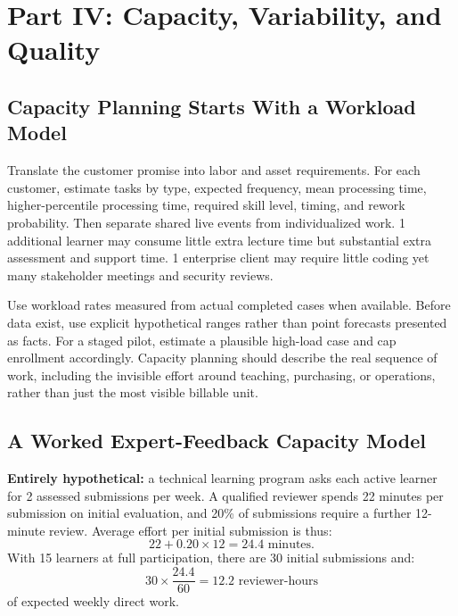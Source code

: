 \section*{Part IV: Capacity, Variability, and Quality}

\subsection{Capacity Planning Starts With a Workload Model}
\label{sec:capacity_planning_workload_model}

Translate the customer promise into labor and asset requirements. For each customer, estimate tasks by type, expected frequency, mean processing time, higher-percentile processing time, required skill level, timing, and rework probability. Then separate shared live events from individualized work. 1 additional learner may consume little extra lecture time but substantial extra assessment and support time. 1 enterprise client may require little coding yet many stakeholder meetings and security reviews.

Use workload rates measured from actual completed cases when available. Before data exist, use explicit hypothetical ranges rather than point forecasts presented as facts. For a staged pilot, estimate a plausible high-load case and cap enrollment accordingly. Capacity planning should describe the real sequence of work, including the invisible effort around teaching, purchasing, or operations, rather than just the most visible billable unit.

\subsection{A Worked Expert-Feedback Capacity Model}
\label{sec:worked_feedback_capacity_model}

\textbf{Entirely hypothetical:} a technical learning program asks each active learner for 2 assessed submissions per week. A qualified reviewer spends 22 minutes per submission on initial evaluation, and 20\% of submissions require a further 12-minute review. Average effort per initial submission is thus:
\begin{equation}
22 + 0.20 \times 12 = 24.4\text{ minutes}.
\end{equation}
With 15 learners at full participation, there are 30 initial submissions and:
\begin{equation}
30 \times \frac{24.4}{60} = 12.2\text{ reviewer-hours}
\end{equation}
of expected weekly direct work.

